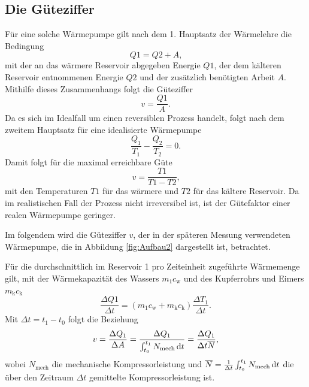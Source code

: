 \subsection{Die Güteziffer}
Für eine solche Wärmepumpe gilt nach dem 1. Hauptsatz der Wärmelehre die Bedingung
\begin{equation}
Q1 = Q2 + A\label{eq:Q1}\text{,}
\end{equation}
mit der an das wärmere Reservoir abgegeben Energie $Q1$, der dem kälteren
Reservoir entnommenen Energie $Q2$ und der zusätzlich benötigten Arbeit $A$.
Mithilfe dieses Zusammenhangs folgt die Güteziffer
\begin{equation}
v = \frac{Q1}{A}\label{eq:v1}\text{.}
\end{equation}
Da es sich im Idealfall um einen reversiblen Prozess handelt, folgt nach dem zweitem Hauptsatz für eine idealisierte Wärmepumpe
\begin{equation}
\frac{Q_1}{T_1}-\frac{Q_2}{T_2}=0\label{eq:redQ}\text{.}
\end{equation}
Damit folgt für die maximal erreichbare Güte
\begin{equation}
v = \frac{T1}{T1-T2}\label{eq:vid}\text{,}
\end{equation}
mit den Temperaturen $T1$ für das wärmere und $T2$ für das kältere Reservoir.
Da im realistischen Fall der Prozess nicht irreversibel ist, ist der Gütefaktor einer realen Wärmepumpe geringer.

Im folgendem wird die Güteziffer $v$, der in der späteren Messung verwendeten Wärmepumpe, die in Abbildung \ref{fig:Aufbau2} dargestellt ist, betrachtet. 

Für die durchschnittlich im Reservoir 1 pro Zeiteinheit zugeführte Wärmemenge gilt, mit der Wärmekapazität des Wassers $m_1c_\text{w}$ und des Kupferrohrs und Eimers $m_\text{k}c_\text{k}$
\begin{equation}
  \frac{\Delta Q1}{\Delta t} = \left( m_1c_\text{w} + m_\text{k}c_\text{k}\right) \frac{\Delta T_1}{\Delta t}\text{.}\label{eq:T1Q1}
\end{equation}
Mit $\Delta t= t_1 -t_0$ folgt die Beziehung
\begin{equation}
	v = \frac{\Delta Q_1}{\Delta A} =\frac{\Delta Q_1}{\int_{t_0}^{t_1} N_\text{mech} \mathop{}\!\mathrm{d} t} = \frac{\Delta Q_1}{\Delta t \overline{N}}\text{,}
\end{equation}
wobei $N_\text{mech}$ die mechanische  Kompressorleistung und $\overline{N}=\frac{1}{\Delta t} \int_{t_0}^{t_1} N_\text{mech} \mathop{}\!\mathrm{d} t$ die über den Zeitraum $\Delta t$ gemittelte Kompressorleistung ist.


